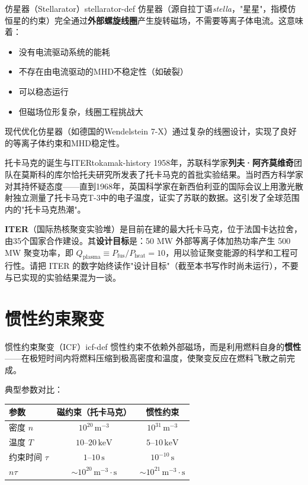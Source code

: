 \documentclass[12pt,a4paper,openany,oneside]{book}
\newcommand{\difficulty}[1]{\marginnote{\hfill\textcolor{coverMid!80}{\rule[-0.1em]{2pt}{0.9em}}\,\textcolor{coverMid}{\footnotesize\textbf{[#1]}}}}
\begin{document}
\begin{definition}{仿星器（Stellarator）}{stellarator-def}
仿星器（源自拉丁语\textit{stella}，"星星"，指模仿恒星的约束）完全通过\textbf{外部螺旋线圈}产生旋转磁场，不需要等离子体电流。这意味着：
\begin{itemize}
\item 没有电流驱动系统的能耗
\item 不存在由电流驱动的MHD不稳定性（如破裂）
\item 可以稳态运行
\item 但磁场位形复杂，线圈工程挑战大
\end{itemize}
现代优化仿星器（如德国的Wendelstein 7-X）通过复杂的线圈设计，实现了良好的等离子体约束和MHD稳定性。
\end{definition}

\begin{history}{托卡马克的诞生与ITER}{tokamak-history}
1958年，苏联科学家\textbf{列夫·阿齐莫维奇}团队在莫斯科的库尔恰托夫研究所发表了托卡马克的首批实验结果。当时西方科学家对其持怀疑态度——直到1968年，英国科学家在新西伯利亚的国际会议上用激光散射独立测量了托卡马克T-3中的电子温度，证实了苏联的数据。这引发了全球范围内的"托卡马克热潮"。

\textbf{ITER}（国际热核聚变实验堆）是目前在建的最大托卡马克，位于法国卡达拉舍，由35个国家合作建设。其\textbf{设计目标}是：50 MW 外部等离子体加热功率产生 500 MW 聚变功率，即 $Q_{\text{plasma}}\equiv P_{\text{fus}}/P_{\text{heat}}=10$，用以验证聚变能源的科学和工程可行性。请把 ITER 的数字始终读作"设计目标"（截至本书写作时尚未运行），不要与已实现的实验结果混为一谈。
\end{history}

\section{惯性约束聚变}\difficulty{基础}

\begin{definition}{惯性约束聚变（ICF）}{icf-def}
惯性约束不依赖外部磁场，而是利用燃料自身的\textbf{惯性}——在极短时间内将燃料压缩到极高密度和温度，使聚变反应在燃料飞散之前完成。

典型参数对比：
\begin{center}
\begin{tabular}{lcc}
\toprule
\textbf{参数} & \textbf{磁约束（托卡马克）} & \textbf{惯性约束} \\
\midrule
密度 $n$ & $10^{20}\,\mathrm{m}^{-3}$ & $10^{31}\,\mathrm{m}^{-3}$ \\
温度 $T$ & $10$--$20\,\mathrm{keV}$ & $5$--$10\,\mathrm{keV}$ \\
约束时间 $\tau$ & $1$--$10\,\mathrm{s}$ & $10^{-10}\,\mathrm{s}$ \\
$n\tau$ & $\sim 10^{20}\,\mathrm{m}^{-3}\cdot\mathrm{s}$ & $\sim 10^{21}\,\mathrm{m}^{-3}\cdot\mathrm{s}$ \\
\bottomrule
\end{tabular}
\end{center}
\end{definition}
\end{document}
